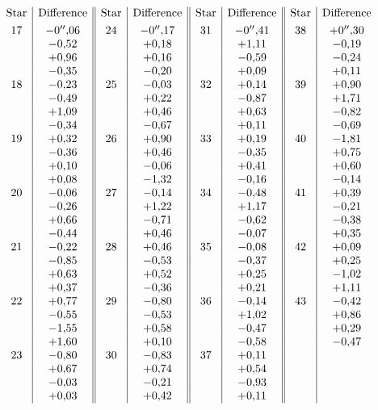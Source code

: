 \par\clearpage
\noindent\makebox[12mm][l]{}\par\medskip

{\small
\[
\begin{array}{@{}c|c||c|c||c|c||c|c@{}}
\text{Star}&\text{Difference}&\text{Star}&\text{Difference}&
\text{Star}&\text{Difference}&\text{Star}&\text{Difference}\\[.8ex]
17&-0''{,}06&24&-0''{,}17&31&-0''{,}41&38&+0''{,}30\\
&-0{,}52&&+0{,}18&&+1{,}11&&-0{,}19\\
&+0{,}96&&+0{,}16&&-0{,}59&&-0{,}24\\
&-0{,}35&&-0{,}20&&+0{,}09&&+0{,}11\\
18&-0{,}23&25&-0{,}03&32&+0{,}14&39&+0{,}90\\
&-0{,}49&&+0{,}22&&-0{,}87&&+1{,}71\\
&+1{,}09&&+0{,}46&&+0{,}63&&-0{,}82\\
&-0{,}34&&-0{,}67&&+0{,}11&&-0{,}69\\
19&+0{,}32&26&+0{,}90&33&+0{,}19&40&-1{,}81\\
&-0{,}36&&+0{,}46&&-0{,}35&&+0{,}75\\
&+0{,}10&&-0{,}06&&+0{,}41&&+0{,}60\\
&+0{,}08&&-1{,}32&&-0{,}16&&-0{,}14\\
20&-0{,}06&27&-0{,}14&34&-0{,}48&41&+0{,}39\\
&-0{,}26&&+1{,}22&&+1{,}17&&-0{,}21\\
&+0{,}66&&-0{,}71&&-0{,}62&&-0{,}38\\
&-0{,}44&&+0{,}46&&-0{,}07&&+0{,}35\\
21&-0{,}22&28&+0{,}46&35&-0{,}08&42&+0{,}09\\
&-0{,}85&&-0{,}53&&-0{,}37&&+0{,}25\\
&+0{,}63&&+0{,}52&&+0{,}25&&-1{,}02\\
&+0{,}37&&-0{,}36&&+0{,}21&&+1{,}11\\
22&+0{,}77&29&-0{,}80&36&-0{,}14&43&-0{,}42\\
&-0{,}55&&-0{,}53&&+1{,}02&&+0{,}86\\
&-1{,}55&&+0{,}58&&-0{,}47&&+0{,}29\\
&+1{,}60&&+0{,}10&&-0{,}58&&-0{,}47\\
23&-0{,}80&30&-0{,}83&37&+0{,}11&&\\
&+0{,}67&&+0{,}74&&+0{,}54&&\\
&-0{,}03&&-0{,}21&&-0{,}93&&\\
&+0{,}03&&+0{,}42&&+0{,}11&&
\end{array}
\]
\par
}

